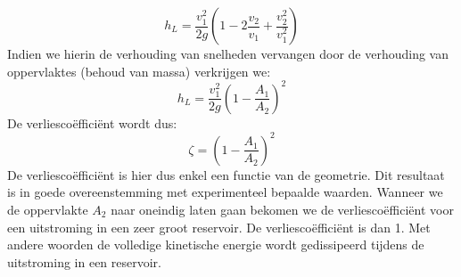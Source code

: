 \begin{equation}
	h_L = \frac{v_1^2}{2 g} \left(1 - 2\frac{v_2}{v_1} + \frac{v_2^2}{v_1^2} \right)
\end{equation}
Indien we hierin de verhouding van snelheden vervangen door de verhouding van oppervlaktes (behoud van massa) verkrijgen we:
\begin{equation}
	h_L = \frac{v_1^2}{2 g} \left(1 - \frac{A_1}{A_2} \right)^2
\end{equation}
De verliescoëfficiënt wordt dus:
\begin{equation}
	\zeta = \left(1 - \frac{A_1}{A_2} \right)^2
\end{equation}
De verliescoëfficiënt is hier dus enkel een functie van de geometrie. Dit resultaat is in goede overeenstemming met experimenteel bepaalde waarden. Wanneer we de oppervlakte $A_2$ naar oneindig laten gaan bekomen we de verliescoëfficiënt voor een uitstroming in een zeer groot reservoir. De verliescoëfficiënt is dan 1. Met andere woorden de volledige kinetische energie wordt gedissipeerd tijdens de uitstroming in een reservoir.

